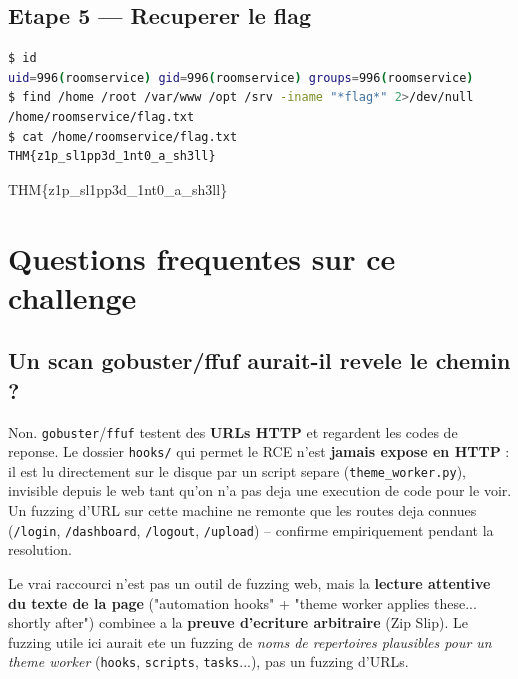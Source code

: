 \documentclass[11pt,a4paper]{article}
\begin{document}
\subsection{Etape 5 --- Recuperer le flag}

\begin{lstlisting}[language=bash]
$ id
uid=996(roomservice) gid=996(roomservice) groups=996(roomservice)
$ find /home /root /var/www /opt /srv -iname "*flag*" 2>/dev/null
/home/roomservice/flag.txt
$ cat /home/roomservice/flag.txt
THM{z1p_sl1pp3d_1nt0_a_sh3ll}
\end{lstlisting}

\begin{tcolorbox}[colback=black, colframe=gold, coltext=codegreen, arc=2pt,
  fonttitle=\bfseries\color{white}, coltitle=white, title=Flag obtenu]
\ttfamily THM\{z1p\_sl1pp3d\_1nt0\_a\_sh3ll\}
\end{tcolorbox}

\section{Questions frequentes sur ce challenge}

\subsection{Un scan gobuster/ffuf aurait-il revele le chemin ?}

Non. \texttt{gobuster}/\texttt{ffuf} testent des \textbf{URLs HTTP} et
regardent les codes de reponse. Le dossier \texttt{hooks/} qui permet le
RCE n'est \textbf{jamais expose en HTTP} : il est lu directement sur
le disque par un script separe (\texttt{theme\_worker.py}), invisible
depuis le web tant qu'on n'a pas deja une execution de code pour le
voir. Un fuzzing d'URL sur cette machine ne remonte que les routes deja
connues (\texttt{/login}, \texttt{/dashboard}, \texttt{/logout},
\texttt{/upload}) -- confirme empiriquement pendant la resolution.

\begin{noteok}
Le vrai raccourci n'est pas un outil de fuzzing web, mais la
\textbf{lecture attentive du texte de la page} ("automation hooks" +
"theme worker applies these... shortly after") combinee a la
\textbf{preuve d'ecriture arbitraire} (Zip Slip). Le fuzzing utile ici
aurait ete un fuzzing de \emph{noms de repertoires plausibles pour un
theme worker} (\texttt{hooks}, \texttt{scripts}, \texttt{tasks}...),
pas un fuzzing d'URLs.
\end{noteok}
\end{document}
